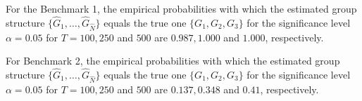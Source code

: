 \documentclass[a4paper,12pt]{article}
\begin{document}
\begin{enumerate}[label=\arabic*.,leftmargin=0.6cm]
{For the Benchmark 1, the empirical probabilities with which the estimated group structure $\{ \widehat{G}_1,\ldots,\widehat{G}_{\widehat{N}}\}$ equals the true one $\{G_1,G_2,G_3\}$ for the significance level $\alpha=0.05$ for $T=100, 250$ and $500$ are $0.987, 1.000$ and $1.000$, respectively.

For Benchmark 2, the empirical probabilities with which the estimated group structure $\{ \widehat{G}_1,\ldots,\widehat{G}_{\widehat{N}}\}$ equals the true one $\{G_1,G_2,G_3\}$ for the significance level $\alpha=0.05$ for $T=100, 250$ and $500$ are $0.137, 0.348$ and $0.41$, respectively.
}

%
%
%
%
%


\end{enumerate}
\end{document}
